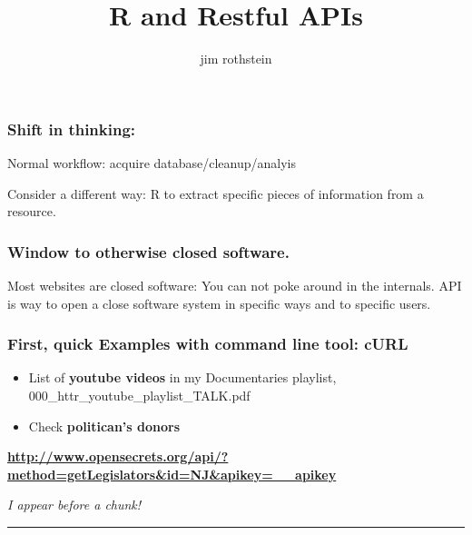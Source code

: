 \documentclass[
  10pt,
]{article}
\title{R and Restful APIs}
\author{jim rothstein}
\date{}
\begin{document}
\maketitle

{
\setcounter{tocdepth}{4}
\tableofcontents
}
\hypertarget{shift-in-thinking}{%
\subsubsection{Shift in thinking:}\label{shift-in-thinking}}

Normal workflow: acquire database/cleanup/analyis

Consider a different way: R to extract specific pieces of information
from a resource.

\hypertarget{window-to-otherwise-closed-software.}{%
\subsubsection{Window to otherwise closed
software.}\label{window-to-otherwise-closed-software.}}

Most websites are closed software: You can not poke around in the
internals. API is way to open a close software system in specific ways
and to specific users.

\hypertarget{first-quick-examples-with-command-line-tool-curl}{%
\subsubsection{First, quick Examples with command line tool:
cURL}\label{first-quick-examples-with-command-line-tool-curl}}

\begin{itemize}
\item
  List of \textbf{youtube videos} in my Documentaries playlist,
  000\_httr\_youtube\_playlist\_TALK.pdf
\item
  Check \textbf{politican's donors}
\end{itemize}

\textbf{\url{http://www.opensecrets.org/api/?method=getLegislators\&id=NJ\&apikey=__apikey}}

\footnotesize \emph{I appear before a chunk!}

\rule{3cm}{.4pt}
\end{document}
